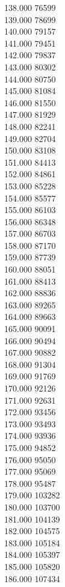 { 138.000	76599 \\
 139.000	78699 \\
 140.000	79157 \\
 141.000	79451 \\
 142.000	79837 \\
 143.000	80302 \\
 144.000	80750 \\
 145.000	81084 \\
 146.000	81550 \\
 147.000	81929 \\
 148.000	82241 \\
 149.000	82704 \\
 150.000	83108 \\
 151.000	84413 \\
 152.000	84861 \\
 153.000	85228 \\
 154.000	85577 \\
 155.000	86103 \\
 156.000	86348 \\
 157.000	86703 \\
 158.000	87170 \\
 159.000	87739 \\
 160.000	88051 \\
 161.000	88413 \\
 162.000	88836 \\
 163.000	89265 \\
 164.000	89663 \\
 165.000	90091 \\
 166.000	90494 \\
 167.000	90882 \\
 168.000	91304 \\
 169.000	91769 \\
 170.000	92126 \\
 171.000	92631 \\
 172.000	93456 \\
 173.000	93493 \\
 174.000	93936 \\
 175.000	94852 \\
 176.000	95050 \\
 177.000	95069 \\
 178.000	95487 \\
 179.000	103282 \\
 180.000	103700 \\
 181.000	104139 \\
 182.000	104575 \\
 183.000	105184 \\
 184.000	105397 \\
 185.000	105820 \\
 186.000	107434 \\
}
